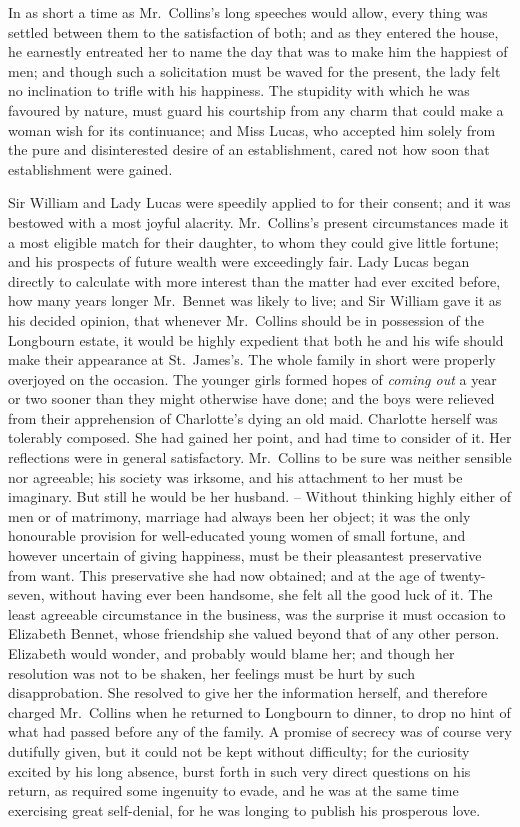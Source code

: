 In as short a time as Mr.\ Collins’s long speeches would
allow, every thing was settled between them to the satisfaction
of both; and as they entered the house, he earnestly
entreated her to name the day that was to make him the
happiest of men; and though such a solicitation must be
waved for the present, the lady felt no inclination to
trifle with his happiness. The stupidity with which he
was favoured by nature, must guard his courtship from
any charm that could make a woman wish for its continuance;
and Miss Lucas, who accepted him solely from the
pure and disinterested desire of an establishment, cared
not how soon that establishment were gained.

Sir William and Lady Lucas were speedily applied to
for their consent; and it was bestowed with a most
joyful alacrity. Mr.\ Collins’s present circumstances made
it a most eligible match for their daughter, to whom they
could give little fortune; and his prospects of future
wealth were exceedingly fair. Lady Lucas began directly
to calculate with more interest than the matter had ever
excited before, how many years longer Mr.\ Bennet was
likely to live; and Sir William gave it as his decided
opinion, that whenever Mr.\ Collins should be in possession
of the Longbourn estate, it would be highly expedient
that both he and his wife should make their appearance
at St.\ James’s. The whole family in short were properly
overjoyed on the occasion. The younger girls formed
hopes of \textit{coming out} a year or two sooner than they might
otherwise have done; and the boys were relieved from
their apprehension of Charlotte’s dying an old maid.
Charlotte herself was tolerably composed. She had gained
her point, and had time to consider of it. Her reflections
were in general satisfactory. Mr.\ Collins to be sure was
neither sensible nor agreeable; his society was irksome,
and his attachment to her must be imaginary. But still
he would be her husband. -- Without thinking highly either
of men or of matrimony, marriage had always been her
object; it was the only honourable provision for well-educated
young women of small fortune, and however
uncertain of giving happiness, must be their pleasantest
preservative from want. This preservative she had now
obtained; and at the age of twenty-seven, without having
ever been handsome, she felt all the good luck of it. The
least agreeable circumstance in the business, was the surprise
it must occasion to Elizabeth Bennet, whose friendship
she valued beyond that of any other person. Elizabeth
would wonder, and probably would blame her; and though
her resolution was not to be shaken, her feelings must be
hurt by such disapprobation. She resolved to give her
the information herself, and therefore charged Mr.\ Collins
when he returned to Longbourn to dinner, to drop no
hint of what had passed before any of the family. A promise
of secrecy was of course very dutifully given, but it
could not be kept without difficulty; for the curiosity
excited by his long absence, burst forth in such very
direct questions on his return, as required some ingenuity
to evade, and he was at the same time exercising great
self-denial, for he was longing to publish his prosperous love.

